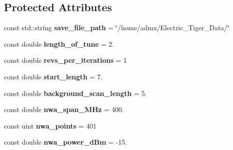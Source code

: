 \subsection*{Protected Attributes}
\begin{DoxyCompactItemize}
\item 
const std\+::string {\bfseries save\+\_\+file\+\_\+path} = \char`\"{}/home/admx/Electric\+\_\+\+Tiger\+\_\+\+Data/\char`\"{}\hypertarget{classetig_1_1_program_core_a676ae3389038bf3fd3ba72d25c91ca14}{}\label{classetig_1_1_program_core_a676ae3389038bf3fd3ba72d25c91ca14}

\item 
const double {\bfseries length\+\_\+of\+\_\+tune} = 2.\hypertarget{classetig_1_1_program_core_a2e5f6bcfde100f8b02bc27759bca2634}{}\label{classetig_1_1_program_core_a2e5f6bcfde100f8b02bc27759bca2634}

\item 
const double {\bfseries revs\+\_\+per\+\_\+iterations} = 1\hypertarget{classetig_1_1_program_core_aebaed1df58743c5d2153e24d130d0a8c}{}\label{classetig_1_1_program_core_aebaed1df58743c5d2153e24d130d0a8c}

\item 
const double {\bfseries start\+\_\+length} = 7.\hypertarget{classetig_1_1_program_core_af9378cd76eb6a08a0f4ee68e7e1e38d2}{}\label{classetig_1_1_program_core_af9378cd76eb6a08a0f4ee68e7e1e38d2}

\item 
const double {\bfseries background\+\_\+scan\+\_\+length} = 5.\hypertarget{classetig_1_1_program_core_a9df4bede1a3ce203653cf350a2aebe0c}{}\label{classetig_1_1_program_core_a9df4bede1a3ce203653cf350a2aebe0c}

\item 
const double {\bfseries nwa\+\_\+span\+\_\+\+M\+Hz} = 400.\hypertarget{classetig_1_1_program_core_aae6510cbce708f827a8e0a68f35faddc}{}\label{classetig_1_1_program_core_aae6510cbce708f827a8e0a68f35faddc}

\item 
const uint {\bfseries nwa\+\_\+points} = 401\hypertarget{classetig_1_1_program_core_ad7add3a027aa2b2658b207ada1b900b7}{}\label{classetig_1_1_program_core_ad7add3a027aa2b2658b207ada1b900b7}

\item 
const double {\bfseries nwa\+\_\+power\+\_\+d\+Bm} = -\/15.\hypertarget{classetig_1_1_program_core_a37f048a230fc7e4c9720b8b283acec72}{}\label{classetig_1_1_program_core_a37f048a230fc7e4c9720b8b283acec72}


\end{DoxyCompactItemize}
